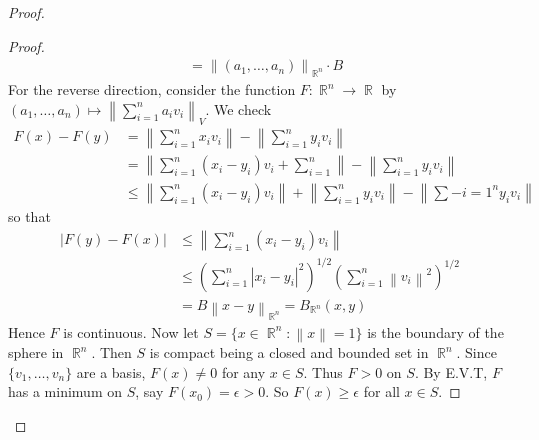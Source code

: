 \documentclass[12pt, a4paper]{book}
\DeclareMathOperator{\R}{\mathbb{R}}
\newcommand{\norm}[1]{\left\lVert#1\right\rVert} %
\theoremstyle{nonumberplain}
\newtheorem{proof}{Proof}
\begin{document}
\begin{proof}
\begin{proof}
\begin{align*}
        &= \norm{(a_1,\ldots,a_n)}_{\R^n}\cdot B
    \end{align*}
    For the reverse direction, consider the function $F:\R^n\to\R$ by $(a_1,\ldots,a_n)\mapsto\norm{\sum\limits_{i=1}^na_iv_i}_V$.
    We check
    \begin{align*}
        F(x)-F(y) &= \norm{\sum\limits_{i=1}^n x_iv_i}-\norm{\sum\limits_{i=1}^n y_iv_i}\\
        &= \norm{\sum\limits_{i=1}^n(x_i-y_i)v_i+\sum\limits_{i=1}^n}-\norm{\sum\limits_{i=1}^ny_iv_i}\\
        &\leq \norm{\sum\limits_{i=1}^n(x_i-y_i)v_i}+\norm{\sum\limits_{i=1}^n y_iv_i}-\norm{\sum\limits-{i=1}^ny_iv_i}
    \end{align*}
    so that
    \begin{align*}
        |F(y)-F(x)|&\leq\norm{\sum\limits_{i=1}^n(x_i-y_i)v_i}\\
        &\leq \left( \sum\limits_{i=1}^n|x_i-y_i|^2 \right)^{1/2} \left( \sum\limits_{i=1}^n\norm{v_i}^2 \right)^{1/2}\\
        &= B\norm{x-y}_{\R^n}=B_{\R^n}(x,y)
    \end{align*}
    Hence $F$ is continuous. Now let $S=\{x\in\R^n:\norm{x}=1\}$ is the boundary of the sphere in $\R^n$. Then
    $S$ is compact being a closed and bounded set in $\R^n$. Since $\{v_1,\ldots,v_n\}$ are a basis, $F(x)\neq 0$ for
    any $x\in S$. Thus $F>0$ on $S$. By E.V.T, $F$ has a minimum on $S$, say $F(x_0)=\epsilon>0$. So $F(x)\geq\epsilon$
    for all $x\in S$.


\end{proof}
\end{proof}
\end{document}
